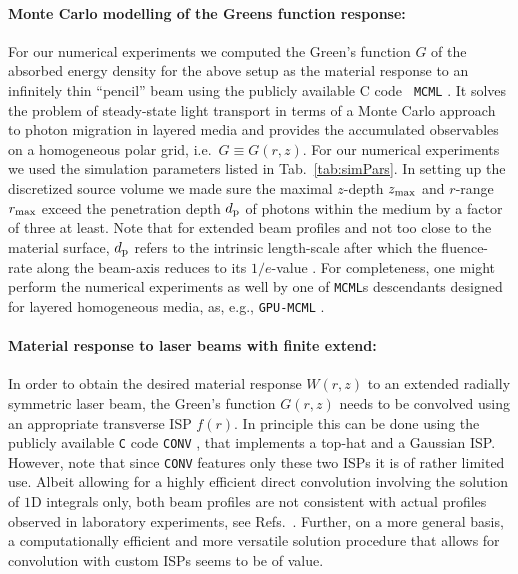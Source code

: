 \documentclass[12pt]{iopart}
\begin{document}
\paragraph{Monte Carlo modelling of the Greens function response:}
For our numerical experiments we computed the Green's function $G$ of the
absorbed energy density for the above setup as the material response to an
infinitely thin ``pencil'' beam using the publicly available {\rm C} code {\tt
MCML} \cite{MCML:1995}. It solves the problem of steady-state light transport
in terms of a Monte Carlo approach to photon migration in layered media and
provides the accumulated observables on a homogeneous polar grid, i.e.\
$G\equiv G(r,z)$.  
For our numerical experiments we used the simulation parameters listed in
Tab.~\ref{tab:simPars}. In setting up the discretized source volume we made
sure the maximal $z$-depth $z_{\rm max}$ and $r$-range $r_{\rm max}$ exceed the
penetration depth $d_{\rm p}$ of photons within the medium by a factor of three
at least. Note that for extended beam profiles and not too close to the
material surface, $d_{\rm p}$ refers to the intrinsic length-scale after which
the fluence-rate along the beam-axis reduces to its $1/e$-value
\cite{MCML:1995,Wilson:1990}.  For completeness, one might perform the
numerical experiments as well by one of {\tt MCML}s descendants designed for
layered homogeneous media, as, e.g., {\tt GPU-MCML} \cite{Alerstam:2010}.

\paragraph{Material response to laser beams with finite extend:}
In order to obtain the desired material response $W(r,z)$ to an extended
radially symmetric laser beam, the Green's function $G(r,z)$ needs to be
convolved using an appropriate transverse ISP $f(r)$.  
In principle this can be done using the publicly available {\tt C} 
code {\tt CONV} \cite{CONV:1997}, that implements a top-hat and a Gaussian ISP.  
However, note that since {\tt CONV} features only these two ISPs it is of 
rather limited use. Albeit allowing for a highly efficient direct convolution
involving the solution of $1$D integrals only, both beam profiles are not
consistent with actual profiles observed in laboratory experiments, see
Refs.~\cite{Paltauf:1997, Paltauf:1998, Paltauf:2000, DAlessandro:2012,
Blumenroether:2016}.  
Further, on a more general basis, a computationally efficient and more
versatile solution procedure that allows for convolution with custom ISPs seems
to be of value.
\end{document}
